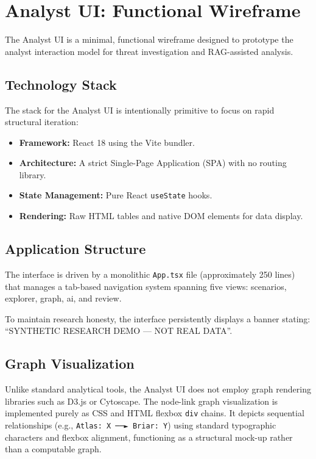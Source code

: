 \section{Analyst UI: Functional Wireframe}
\label{sec:fe-analyst-ui}

The Analyst UI is a minimal, functional wireframe designed to prototype the analyst interaction model for threat investigation and RAG-assisted analysis.

\subsection{Technology Stack}
\label{sec:fe-analyst-stack}

The stack for the Analyst UI is intentionally primitive to focus on rapid structural iteration:
\begin{itemize}
    \item \textbf{Framework:} React 18 using the Vite bundler.
    \item \textbf{Architecture:} A strict Single-Page Application (SPA) with no routing library.
    \item \textbf{State Management:} Pure React \texttt{useState} hooks.
    \item \textbf{Rendering:} Raw HTML tables and native DOM elements for data display.
\end{itemize}

\subsection{Application Structure}
\label{sec:fe-analyst-structure}

The interface is driven by a monolithic \texttt{App.tsx} file (approximately 250 lines) that manages a tab-based navigation system spanning five views: scenarios, explorer, graph, ai, and review.

To maintain research honesty, the interface persistently displays a banner stating: ``SYNTHETIC RESEARCH DEMO — NOT REAL DATA''.

\subsection{Graph Visualization}
\label{sec:fe-analyst-graph}

Unlike standard analytical tools, the Analyst UI does not employ graph rendering libraries such as D3.js or Cytoscape. The node-link graph visualization is implemented purely as CSS and HTML flexbox \texttt{div} chains. It depicts sequential relationships (e.g., \texttt{Atlas: X ──► Briar: Y}) using standard typographic characters and flexbox alignment, functioning as a structural mock-up rather than a computable graph.

